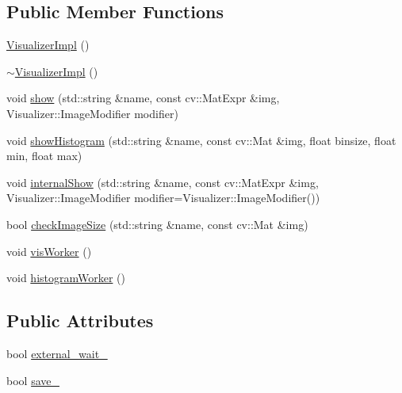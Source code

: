 \subsection*{Public Member Functions}
\begin{DoxyCompactItemize}
\item 
\mbox{\hyperlink{classdvo_1_1visualization_1_1_visualizer_impl_ac9bacd20873b2204c007d8ae897dd793}{Visualizer\+Impl}} ()
\item 
\mbox{\hyperlink{classdvo_1_1visualization_1_1_visualizer_impl_ab2671b8d7b177f4833e308034eeee6a5}{$\sim$\+Visualizer\+Impl}} ()
\item 
void \mbox{\hyperlink{classdvo_1_1visualization_1_1_visualizer_impl_a2076b6b3056314a8bacacdf2fbbfff71}{show}} (std\+::string \&name, const cv\+::\+Mat\+Expr \&img, Visualizer\+::\+Image\+Modifier modifier)
\item 
void \mbox{\hyperlink{classdvo_1_1visualization_1_1_visualizer_impl_a3afe414ca4a899c77458a1a0f1139dbc}{show\+Histogram}} (std\+::string \&name, const cv\+::\+Mat \&img, float binsize, float min, float max)
\item 
void \mbox{\hyperlink{classdvo_1_1visualization_1_1_visualizer_impl_ab7dc97f7e3e3444fb5337fd0e393a237}{internal\+Show}} (std\+::string \&name, const cv\+::\+Mat\+Expr \&img, Visualizer\+::\+Image\+Modifier modifier=Visualizer\+::\+Image\+Modifier())
\item 
bool \mbox{\hyperlink{classdvo_1_1visualization_1_1_visualizer_impl_a0401f138611fc10aa4c8ef3bfb37d02f}{check\+Image\+Size}} (std\+::string \&name, const cv\+::\+Mat \&img)
\item 
void \mbox{\hyperlink{classdvo_1_1visualization_1_1_visualizer_impl_acc30618615be0c6b9d54959a1beaf5e7}{vis\+Worker}} ()
\item 
void \mbox{\hyperlink{classdvo_1_1visualization_1_1_visualizer_impl_aaa9bdf78dde7df4c88fa61c05bfb13bd}{histogram\+Worker}} ()
\end{DoxyCompactItemize}
\subsection*{Public Attributes}
\begin{DoxyCompactItemize}
\item 
bool \mbox{\hyperlink{classdvo_1_1visualization_1_1_visualizer_impl_ae8de60588232e3a67c19e840f8363e2c}{external\+\_\+wait\+\_\+}}
\item 
bool \mbox{\hyperlink{classdvo_1_1visualization_1_1_visualizer_impl_a9142982073b53d888e0533ccf552d903}{save\+\_\+}}
\end{DoxyCompactItemize}


